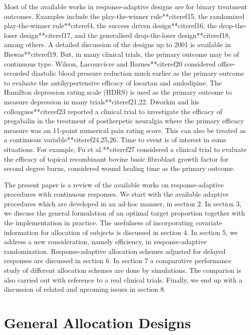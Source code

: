 Most of the available works in response-adaptive designs are for binary treatment outcomes. Examples include the play-the-winner rule**citeref{15}, the randomized play-the-winner rule**citeref{4}, the success driven design**citeref{16}, the drop-the-loser design**citeref{17}, and the generalised drop-the-loser design**citeref{18}, among others. A detailed discussion of the designs up to 2001 is available in Biswas**citeref{19}. But, in many clinical trials, the primary outcome may be of continuous type. Wilson, Lacourci$\grave{e}$re and Barnes**citeref{20} considered office-recorded diastolic blood pressure reduction much earlier as the primary outcome to evaluate the antihypertensive efficacy of losartan and amlodipine. The Hamilton depression rating scale (HDRS) is used as the primary outcome to measure depression in many trials**citeref{21,22}. Dworkin  and his colleagues**citeref{23}  reported a clinical trial to investigate the efficacy of pregabalin in the treatment of postherpetic neuralgia where the primary efficacy measure was an 11-point numerical pain rating score. This can also be treated as a continuous variable**citeref{24,25,26}. Time to event is of interest in some situations. For example, Fu et al.**citeref{27} considered a clinical trial to evaluate the efficacy
of topical recombinant bovine basic fibroblast growth factor for second degree burns, considered wound healing time as the primary outcome.

The present paper is a review of the available works on
response-adaptive procedures with continuous responses. We start
with the available adaptive procedures which are developed in an ad-hoc manner, in section 2. In section 3, we discuss the general formulation of an optimal target proportion together with the implementation in practice. The usefulness of incorporating covariate information for allocation of subjects is discussed in section 4. In section 5, we address a new consideration, namely efficiency,  in response-adaptive randomization. Response-adaptive allocation schemes adjusted for delayed responses are discussed in section 6. In section 7 a comparative performance study of different allocation schemes are done by simulations. The comparion is also carried out with reference to a real clinical trials. Finally, we end up with a discussion of related and upcoming issues in section 8.

\section{General Allocation Designs}

